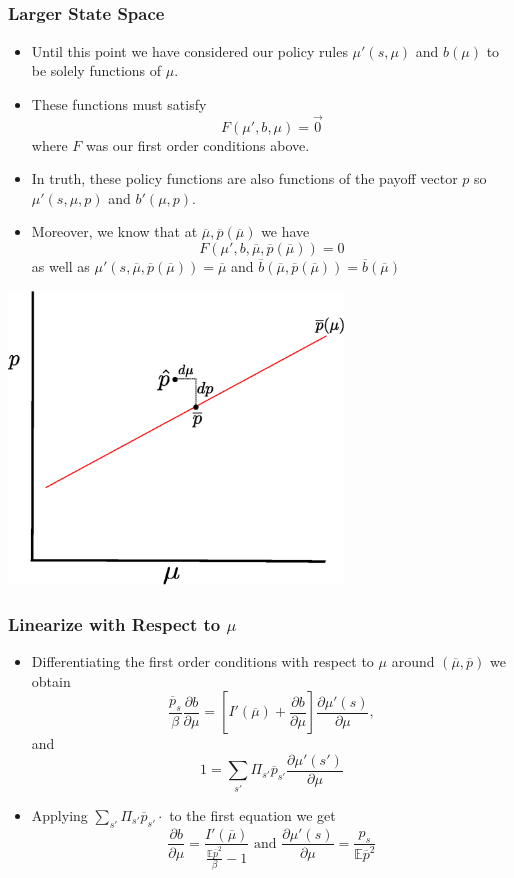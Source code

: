\documentclass{beamer}
\newcommand{\EE}{\mathbb E}
\newcommand{\pbar}{{\overline p}}
\newcommand{\bbar}{{\overline b}}
\newcommand{\mubar}{{\overline \mu}}
\begin{document}
\subsection{}
\begin{frame}
	\frametitle{Larger State Space}
	\begin{itemize}
		\item Until this point we have considered our policy rules $\mu'(s,\mu)$ and $b(\mu)$ to be solely functions of $\mu$.
		\item These functions must satisfy
		\[
			F(\mu',b,\mu) = \vec 0
		\]where $F$ was our first order conditions above.
		\item  In truth, these policy functions  are also functions of the payoff vector $p$ so $\mu'(s,\mu,p)$ and $b'(\mu,p)$.
		\item  Moreover, we know that at $\mubar,\pbar(\mubar)$  we have
		\[
			F(\mu',b,\mubar,\pbar(\mubar)) = 0
		\]as well as  $\mu'(s,\mubar,\pbar(\mubar)) = \mubar$ and $\bbar(\mubar,\pbar(\mubar)) = \bbar(\mubar)$
	\end{itemize}
\end{frame}
\begin{frame}
\begin{center}
	\includegraphics[width=3.5in]{Images/state_space.eps}
\end{center}
\end{frame}
\begin{frame}
	\frametitle{Linearize with Respect to $\mu$}
	\begin{itemize}
		\item  Differentiating the first order conditions with respect to $\mu$ around $(\mubar,\pbar)$ we obtain
		\[
			\frac{\pbar_s}{\beta}\frac{\partial b}{\partial \mu} = \left[I'(\mubar)+\frac{\partial b}{\partial \mu}\right]\frac{\partial \mu'(s)}{\partial \mu},
		\]and 
		\[
			1 = \sum_{s'}\Pi_{s'}\pbar_{s'}\frac{\partial\mu'(s')}{\partial \mu}
		\]
		\item  Applying $\sum_{s'}\Pi_{s'}\pbar_{s'}\cdot$ to the first equation we get
		\[
			\frac{\partial b}{\partial\mu} = \frac{I'(\mubar)}{\frac{\EE\pbar^2}{\beta} - 1}\text{  and }\frac{\partial\mu'(s)}{\partial \mu} = \frac{p_s}{\EE\pbar^2} 
		\]
	\end{itemize}
\end{frame}
\end{document}
